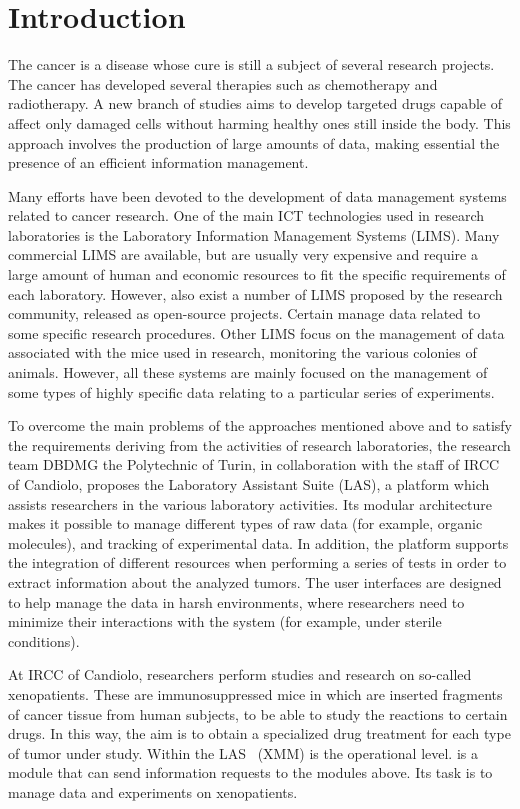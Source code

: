 \chapter{Introduction}\label{chap:intro}

The cancer is a disease whose cure is still a subject of several research projects. The cancer has developed several therapies such as chemotherapy and radiotherapy. A new branch of studies aims to develop targeted drugs capable of affect only damaged cells without harming healthy ones still inside the body. This approach involves the production of large amounts of data, making essential the presence of an efficient information management.

Many efforts have been devoted to the development of data management systems related to cancer research. One of the main ICT technologies used in research laboratories is the Laboratory Information Management Systems (LIMS). Many commercial LIMS are available, but are usually very expensive and require a large amount of human and economic resources to fit the specific requirements of each laboratory. However, also exist a number of LIMS proposed by the research community, released as open-source projects. Certain manage data related to some specific research procedures. Other LIMS focus on the management of data associated with the mice used in research, monitoring the various colonies of animals. However, all these systems are mainly focused on the management of some types of highly specific data relating to a particular series of experiments.

To overcome the main problems of the approaches mentioned above and to satisfy the requirements deriving from the activities of research laboratories, the research team DBDMG the Polytechnic of Turin, in collaboration with the staff of IRCC of Candiolo, proposes the Laboratory Assistant Suite (LAS), a platform which assists researchers in the various laboratory activities. Its modular architecture makes it possible to manage different types of raw data (for example, organic molecules), and tracking of experimental data. In addition, the platform supports the integration of different resources when performing a series of tests in order to extract information about the analyzed tumors. The user interfaces are designed to help manage the data in harsh environments, where researchers need to minimize their interactions with the system (for example, under sterile conditions).

At IRCC of Candiolo, researchers perform studies and research on so-called xenopatients. These are immunosuppressed mice in which are inserted fragments of cancer tissue from human subjects, to be able to study the reactions to certain drugs. In this way, the aim is to obtain a specialized drug treatment for each type of tumor under study. Within the LAS \Xeno\ (XMM) is the operational level. is a module that can send information requests to the modules above. Its task is to manage data and experiments on xenopatients. 


